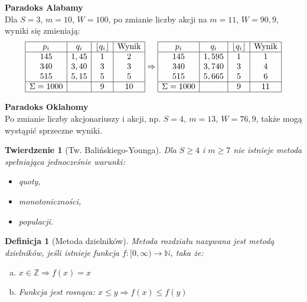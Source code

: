 \documentclass[12pt,a4paper]{article}
\theoremstyle{break}
\newtheorem{definition}{Definicja}[section]
\newtheorem{theorem}{Twierdzenie}[section]
\begin{document}
		\textbf{Paradoks Alabamy}\\
	Dla $S=3$, $m=10$, $W=100$, po zmianie liczby akcji na $m=11$, $W=90,9$, wyniki się zmieniają:
	\[
	\begin{array}{|c|c|c|c|}
		\hline
		p_i & q_i & \lfloor q_i \rfloor & \text{Wynik} \\\hline
		145 & 1,45 & 1 & 2 \\
		340 & 3,40 & 3 & 3 \\
		515 & 5,15 & 5 & 5 \\\hline
		\Sigma=1000 & & 9 & 10 \\\hline
	\end{array}\Rightarrow\begin{array}{|c|c|c|c|}
		\hline
		p_i & q_i & \lfloor q_i \rfloor & \text{Wynik} \\\hline
		145 & 1,595 & 1 & 1 \\
		340 & 3,740 & 3 & 4 \\
		515 & 5,665 & 5 & 6 \\\hline
		\Sigma=1000 & & 9 & 11 \\\hline
	\end{array}
	\]
	
	\textbf{Paradoks Oklahomy}\\
	Po zmianie liczby akcjonariuszy i akcji, np. $S=4,\: m=13, \: W=76,9$, także mogą wystąpić sprzeczne wyniki.
	
	\begin{theorem}[Tw. Balińskiego-Younga]
		Dla $S \geq 4$ i $m \geq 7$ nie istnieje metoda spełniająca jednocześnie warunki:
		\begin{itemize}
			\item quoty,
			\item monotoniczności,
			\item populacji.
		\end{itemize}
	\end{theorem}

	\begin{definition}[Metoda dzielników]
		Metoda rozdziału nazywana jest metodą dzielników, jeśli istnieje funkcja 
		$f: [0, \infty) \to \mathbb{N}$, taka że:
		\begin{enumerate}[a)]
			\item $x \in \mathbb{Z} \Rightarrow f(x) = x$
			\item Funkcja jest rosnąca: $x \leq y \Rightarrow f(x) \leq f(y)$
		\end{enumerate}
	\end{definition}
\end{document}
